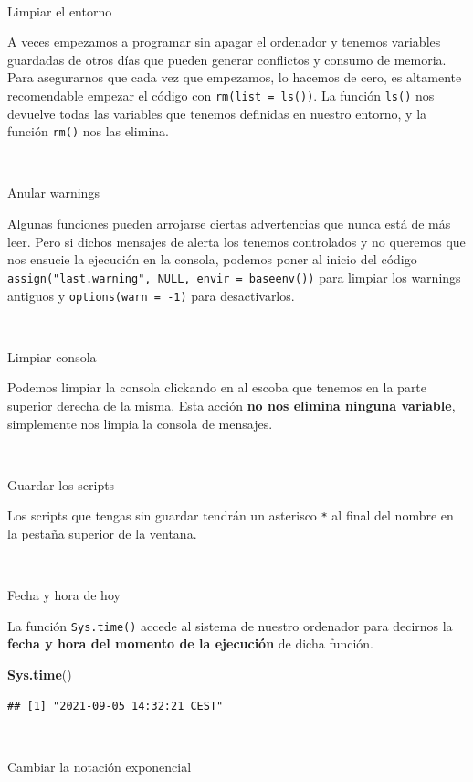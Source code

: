 \documentclass[11pt,]{book}
\newenvironment{Shaded}{\begin{snugshade}}{\end{snugshade}}
\newcommand{\KeywordTok}[1]{\textcolor[rgb]{0.27,0.27,0.27}{\textbf{#1}}}
\newcommand{\NormalTok}[1]{#1}
\begin{document}
~

Limpiar el entorno

A veces empezamos a programar sin apagar el ordenador y tenemos variables guardadas de otros días que pueden generar conflictos y consumo de memoria. Para asegurarnos que cada vez que empezamos, lo hacemos de cero, es altamente recomendable empezar el código con \texttt{rm(list\ =\ ls())}. La función \texttt{ls()} nos devuelve todas las variables que tenemos definidas en nuestro entorno, y la función \texttt{rm()} nos las elimina.

~

Anular warnings

Algunas funciones pueden arrojarse ciertas advertencias que nunca está de más leer. Pero si dichos mensajes de alerta los tenemos controlados y no queremos que nos ensucie la ejecución en la consola, podemos poner al inicio del código \texttt{assign("last.warning",\ NULL,\ envir\ =\ baseenv())} para limpiar los warnings antiguos y \texttt{options(warn\ =\ -1)} para desactivarlos.

~

Limpiar consola

Podemos limpiar la consola clickando en al escoba que tenemos en la parte superior derecha de la misma. Esta acción \textbf{no nos elimina ninguna variable}, simplemente nos limpia la consola de mensajes.

~

Guardar los scripts

Los scripts que tengas sin guardar tendrán un asterisco \texttt{*} al final del nombre en la pestaña superior de la ventana.

~

Fecha y hora de hoy

La función \texttt{Sys.time()} accede al sistema de nuestro ordenador para decirnos la \textbf{fecha y hora del momento de la ejecución} de dicha función.

\begin{Shaded}
\begin{Highlighting}[]
\KeywordTok{Sys.time}\NormalTok{()}
\end{Highlighting}
\end{Shaded}

\begin{verbatim}
## [1] "2021-09-05 14:32:21 CEST"
\end{verbatim}

~

Cambiar la notación exponencial
\end{document}
